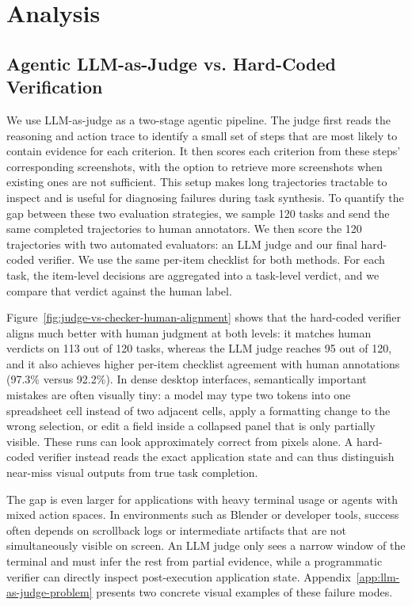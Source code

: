 \section{Analysis}
\label{sec:analysis}
\subsection{Agentic LLM-as-Judge vs. Hard-Coded Verification}
\label{sec:llm-as-judge-comparison}
We use LLM-as-judge as a two-stage agentic pipeline. The judge first reads the
reasoning and action trace to identify a small set of steps that are most
likely to contain evidence for each criterion. It then scores each criterion
from these steps' corresponding screenshots, with the option to retrieve more screenshots when existing ones are not sufficient. This setup makes long trajectories tractable to
inspect and is useful for diagnosing failures during task synthesis.
To quantify the gap between these two evaluation strategies, we sample 120
tasks and send the same completed trajectories to human annotators. We then
score the 120 trajectories with two automated evaluators: an LLM judge and our
final hard-coded verifier. We use the same per-item checklist for both methods.
For each task, the item-level decisions are aggregated into a task-level
verdict, and we compare that verdict against the human label. 


Figure~\ref{fig:judge-vs-checker-human-alignment}
shows that the hard-coded verifier aligns much better with human judgment at
both levels: it matches human verdicts on 113 out of 120 tasks, whereas the LLM
judge reaches 95 out of 120, and it also achieves higher per-item checklist
agreement with human annotations (97.3\% versus 92.2\%).
In dense
desktop interfaces, semantically important mistakes are often visually tiny: a
model may type two tokens into one spreadsheet cell instead of two adjacent
cells, apply a formatting change to the wrong selection, or edit a field inside a collapsed panel that is only partially visible. These runs can look approximately correct from pixels alone. A hard-coded verifier instead reads the exact application state and can thus distinguish near-miss visual outputs from true task completion.

The gap is even larger for applications with heavy terminal usage or agents with mixed action spaces. In environments such as Blender or developer tools, success often depends on scrollback logs or intermediate artifacts that are not simultaneously visible on screen. An LLM judge only sees a narrow window of
the terminal and must infer the rest from partial evidence, while a programmatic verifier can directly inspect post-execution application state. Appendix~\ref{app:llm-as-judge-problem} presents two concrete visual examples of these failure modes.


